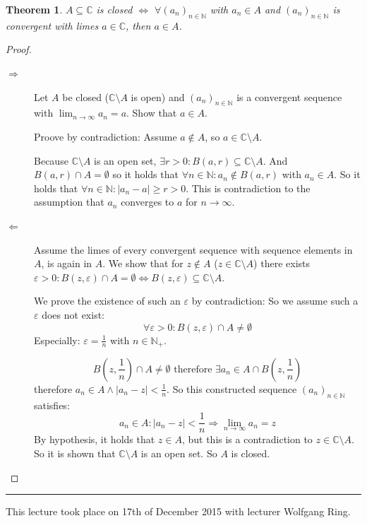 \documentclass[a4paper,landscape,twocolumn]{article}
\newtheorem{theorem}{Theorem}
\newcommand\abs[1]{\left|#1\right|}
\newcommand\seq[1]{{\left(#1\right)}_{n \in \mathbb N}}
\newcommand\meta[3]{\hrule{} This #1 took place on #2 with lecturer #3.\par}
\begin{document}
\begin{theorem}
  $A \subseteq \mathbb C$ is closed $\Leftrightarrow$ $\forall \seq{a_n}$ with $a_n \in A$ and $\seq{a_n}$
  is convergent with limes $a \in \mathbb C$, then $a \in A$.
\end{theorem}
\begin{proof}
  \begin{description}
    \item[$\Rightarrow$]
      Let $A$ be closed ($\mathbb C \setminus A$ is open) and $\seq{a_n}$ is a convergent sequence with $\lim_{n\to\infty} a_n = a$.
      Show that $a \in A$.

      Proove by contradiction: Assume $a \not\in A$, so $a \in \mathbb C \setminus A$.

      Because $\mathbb C \setminus A$ is an open set, $\exists r > 0: B(a, r) \subseteq \mathbb C \setminus A$.
      And $B(a, r) \cap A = \emptyset$ so it holds that $\forall n \in \mathbb N: a_n \not\in B(a, r)$ with $a_n \in A$.
      So it holds that $\forall n \in \mathbb N: \abs{a_n - a} \geq r > 0$. This is contradiction to the assumption
      that $a_n$ converges to $a$ for $n \to \infty$.
    \item[$\Leftarrow$]
      Assume the limes of every convergent sequence with sequence elements in $A$,
      is again in $A$. We show that for $z \not\in A$ ($z \in \mathbb C \setminus A$)
      there exists $\varepsilon > 0: B(z, \varepsilon) \cap A = \emptyset \Leftrightarrow B(z, \varepsilon) \subseteq \mathbb C \setminus A$.

      We prove the existence of such an $\varepsilon$ by contradiction:
      So we assume such a $\varepsilon$ does not exist:
      \[ \forall \varepsilon > 0: B(z, \varepsilon) \cap A \neq \emptyset \]
      Especially: $\varepsilon = \frac1{n}$ with $n \in \mathbb N_+$.

      \[ B(z, \frac1n) \cap A \neq \emptyset \text{ therefore } \exists a_n \in A \cap B(z, \frac1n) \]
      therefore $a_n \in A \land \abs{a_n - z} < \frac1n$.
      So this constructed sequence $\seq{a_n}$ satisfies:
      \[ a_n \in A: \abs{a_n - z} < \frac1n \Rightarrow \lim_{n\to\infty} a_n = z \]
      By hypothesis, it holds that $z \in A$, but this is a contradiction to $z \in \mathbb C \setminus A$.
      So it is shown that $\mathbb C \setminus A$ is an open set. So $A$ is closed.
  \end{description}
\end{proof}

\meta{lecture}{17th of December 2015}{Wolfgang Ring}
\end{document}
